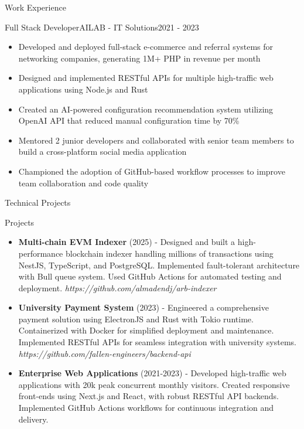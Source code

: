 \documentclass[]{mcdowellcv}
\begin{document}
\begin{cvsection}{Work Experience}
		\begin{cvsubsection}{Full Stack Developer}{AILAB - IT Solutions}{2021 - 2023}
			\begin{itemize}
				\item Developed and deployed full-stack e-commerce and referral systems for networking companies, generating 1M+ PHP in revenue per month
				\item Designed and implemented RESTful APIs for multiple high-traffic web applications using Node.js and Rust
				\item Created an AI-powered configuration recommendation system utilizing OpenAI API that reduced manual configuration time by 70\%
        \item Mentored 2 junior developers and collaborated with senior team members to build a cross-platform social media application
        \item Championed the adoption of GitHub-based workflow processes to improve team collaboration and code quality
			\end{itemize}
		\end{cvsubsection}
	\end{cvsection}

	\begin{cvsection}{Technical Projects}
		\begin{cvsubsection}{Projects}{}{}
			\begin{itemize}
				\item \textbf{Multi-chain EVM Indexer} (2025) - Designed and built a high-performance blockchain indexer handling millions of transactions using NestJS, TypeScript, and PostgreSQL. Implemented fault-tolerant architecture with Bull queue system. Used GitHub Actions for automated testing and deployment. \newline \textit{https://github.com/almadendj/arb-indexer}
				\item \textbf{University Payment System} (2023) - Engineered a comprehensive payment solution using ElectronJS and Rust with Tokio runtime. Containerized with Docker for simplified deployment and maintenance. Implemented RESTful APIs for seamless integration with university systems. \newline \textit{https://github.com/fallen-engineers/backend-api}
				\item \textbf{Enterprise Web Applications} (2021-2023) - Developed high-traffic web applications with 20k peak concurrent monthly visitors. Created responsive front-ends using Next.js and React, with robust RESTful API backends. Implemented GitHub Actions workflows for continuous integration and delivery.
			\end{itemize}
		\end{cvsubsection}
	\end{cvsection}
	
\end{document}
